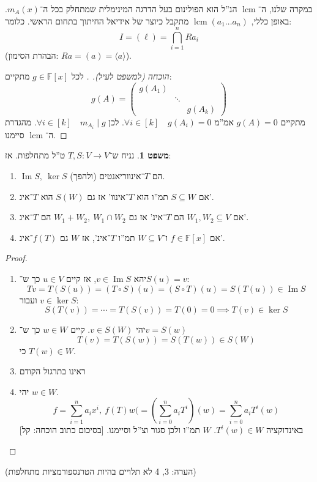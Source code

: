 \documentclass[a4paper]{article}
\newcommand\ml    {\ell}
\newcommand\ra    {\rangle}
\newcommand\la    {\langle}
\DeclareMathOperator\Img   {Im}
\DeclareMathOperator{\lcm}     {lcm}
\newcommand\F         {\mathbb{F}}
\newcommand\co        {\colon}
\newcommand\pms[1]    {\begin{pmatrix}
		#1
\end{pmatrix}}
\newcommand\cl [1]    {\left ( #1 \right )}
\theoremstyle{definition}
\newtheorem{Theorem}{משפט}
\newcommand\theo  [1] {\begin{Theorem}#1\end{Theorem}}
\begin{document}
	במקרה שלנו, ה־$\lcm$ הנ''ל הוא הפולינום בעל הדרגה המינימלית שמתחלק בכל ה־$m_A(x)$. באופן כללי, $\lcm(a_1 \dots a_n)$ מתקבל כיוצר של אידיאל החיתוך בתחום הראשי. כלומר: 
	\[ I = (\ml) = \bigcap_{i = 1}^{n}R a_i \]
	(הבהרת הסימון: $ Ra = (a) = \la a \ra $). 
	\begin{proof}[הוכחה (למשפט לעיל). ]
		לכל $g \in \F[x]$ מתקיים: 
		\[ g(A) = \pms{g(A_1) & & \\ & \ddots & \\ && g(A_k)} \]
		מתקיים $g(A) = 0$ אמ''מ $\forall i \in [k] \quad g(A_i) =0$. לכן $\forall i \in [k] \quad m_{A_i} \mid g$. מהגדרת ה־$\lcm$ סיימנו. 
	\end{proof}
	
	\theo{נניח ש־$T, S \co V \to V$ ט''ל מתחלפות. אז: 
		\begin{enumerate}
			\item $\Img S, \ \ker S$ הם $T$־אינווריאנטים (ולהפך). 
			\item אם $S \subseteq W$ תמ''ו הוא $T$־אינוו' אז גם $S(W)$ הוא $T$־אינ'. 
			\item אם $W_1, W_2 \subseteq V$ הם $T$־אינ' אז גם $W_1 + W_2, \ W_1 \cap W_2$ הם $T$־אינ'. 
			\item אם $f \in \F[x]$ ו־$W \subseteq V$ תמ''ו $T$־אינ', אז $W$ גם $f(T)$־אינ'. 
	\end{enumerate}}
	\begin{proof}\,
		\begin{enumerate}
			\item יהא $v \in \Img S$, אז קיים $u \in V$ כך ש־$S(u) = v$: 
			\[ Tv = T(S(u)) = (T \circ S)(u) = (S \circ T)(u) = S(T(u)) \in \Img S \]
			ועבור $v \in \ker S$: 
			\[ S(T(v)) = \cdots = T(S(v)) = T(0) = 0 \implies T(v) \in \ker S \]
			\item יהי $v \in S(W)$. קיים $w \in W$ כך ש־$v = S(w)$
			\[ T(v) = T(S(w)) = S(T(w)) \in S(W) \]
			כי $T(w) \in W$. 
			\item ראינו בתרגול הקודם
			\item יהי $w \in W$. 
			\[ f = \sum_{i = 1}^{n}a_ix^{i}, \ f(T)w( = \cl{\sum_{i = 0}^{n}a_iT^{i}}(w) = \sum_{i = 0}^{n}a_iT^{i}(w) \]
			באינדוקציה $T^{i}(w) \in W$. $W$ תמ''ו ולכן סגור וצ''ל וסיימנו. [בסיכום כתוב הוכחה: קל]
		\end{enumerate}
	\end{proof}
	(הערה: 3, 4 לא תלויים בהיות הטרנספורמציות מתחלפות)
	
\end{document}

